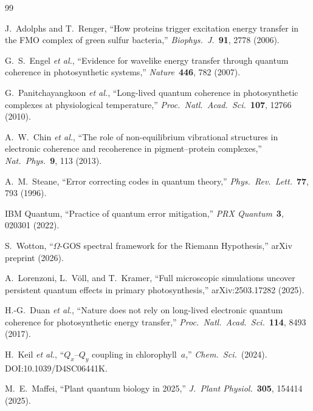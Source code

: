 \documentclass[11pt,twocolumn]{article}
\begin{document}
\normalsize

\begin{thebibliography}{99}

  J.~Adolphs and T.~Renger,
  ``How proteins trigger excitation energy transfer in the FMO complex
  of green sulfur bacteria,''
  \textit{Biophys.\ J.}\ \textbf{91}, 2778 (2006).

  G.~S.~Engel \textit{et al.},
  ``Evidence for wavelike energy transfer through quantum coherence in
  photosynthetic systems,''
  \textit{Nature}\ \textbf{446}, 782 (2007).

  G.~Panitchayangkoon \textit{et al.},
  ``Long-lived quantum coherence in photosynthetic complexes at
  physiological temperature,''
  \textit{Proc.\ Natl.\ Acad.\ Sci.}\ \textbf{107}, 12766 (2010).

  A.~W.~Chin \textit{et al.},
  ``The role of non-equilibrium vibrational structures in electronic
  coherence and recoherence in pigment--protein complexes,''
  \textit{Nat.\ Phys.}\ \textbf{9}, 113 (2013).

  A.~M.~Steane,
  ``Error correcting codes in quantum theory,''
  \textit{Phys.\ Rev.\ Lett.}\ \textbf{77}, 793 (1996).

  IBM Quantum,
  ``Practice of quantum error mitigation,''
  \textit{PRX Quantum}\ \textbf{3}, 020301 (2022).

  S.~Wotton,
  ``$\Omega$-GOS spectral framework for the Riemann Hypothesis,''
  arXiv preprint (2026).

  A.~Lorenzoni, L.~V\"oll, and T.~Kramer,
  ``Full microscopic simulations uncover persistent quantum effects in
  primary photosynthesis,''
  arXiv:2503.17282 (2025).

  H.-G.~Duan \textit{et al.},
  ``Nature does not rely on long-lived electronic quantum coherence for
  photosynthetic energy transfer,''
  \textit{Proc.\ Natl.\ Acad.\ Sci.}\ \textbf{114}, 8493 (2017).

  H.~Keil \textit{et al.},
  ``$Q_x$--$Q_y$ coupling in chlorophyll~$a$,''
  \textit{Chem.\ Sci.}\ (2024).
  DOI:10.1039/D4SC06441K.

  M.~E.~Maffei,
  ``Plant quantum biology in 2025,''
  \textit{J.\ Plant Physiol.}\ \textbf{305}, 154414 (2025).


\end{thebibliography}
\end{document}
